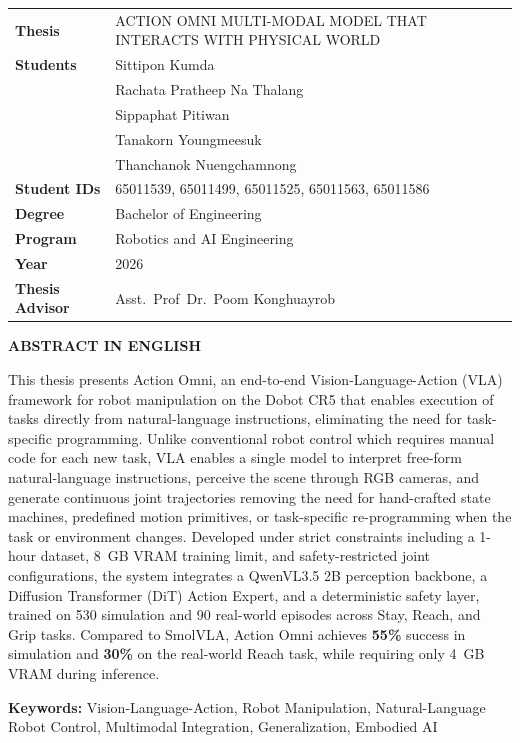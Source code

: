 \noindent
\begin{tabular}{ll}
\textbf{Thesis}          & ACTION OMNI MULTI-MODAL MODEL THAT INTERACTS WITH PHYSICAL WORLD \\
\textbf{Students}        & Sittipon Kumda \\
                         & Rachata Pratheep Na Thalang \\
                         & Sippaphat Pitiwan \\
                         & Tanakorn Youngmeesuk \\
                         & Thanchanok Nuengchamnong \\
\textbf{Student IDs}     & 65011539, 65011499, 65011525, 65011563, 65011586 \\
\textbf{Degree}          & Bachelor of Engineering \\
\textbf{Program}         & Robotics and AI Engineering \\
\textbf{Year}            & 2026 \\
\textbf{Thesis Advisor}  & Asst.~Prof~Dr.~Poom Konghuayrob \\
\end{tabular}

\vspace{1cm}


\begin{center}
\textbf{\Large ABSTRACT IN ENGLISH}
\end{center}

This thesis presents Action Omni, an end-to-end Vision-Language-Action (VLA) framework for robot manipulation on the Dobot CR5 that enables execution of tasks directly from natural-language instructions, eliminating the need for task-specific programming. Unlike conventional robot control which requires manual code for each new task, VLA enables a single model to interpret free-form natural-language instructions, perceive the scene through RGB cameras, and generate continuous joint trajectories removing the need for hand-crafted state machines, predefined motion primitives, or task-specific re-programming when the task or environment changes. Developed under strict constraints including a 1-hour dataset, 8~GB VRAM training limit, and safety-restricted joint configurations, the system integrates a QwenVL3.5 2B perception backbone, a Diffusion Transformer (DiT) Action Expert, and a deterministic safety layer, trained on 530 simulation and 90 real-world episodes across Stay, Reach, and Grip tasks. Compared to SmolVLA, Action Omni achieves \textbf{55\%} success in simulation and \textbf{30\%} on the real-world Reach task, while requiring only 4~GB VRAM during inference.
 



\vspace{0.4cm}
\noindent\textbf{Keywords:} Vision-Language-Action, Robot Manipulation,
Natural-Language Robot Control, Multimodal Integration, Generalization,
Embodied AI